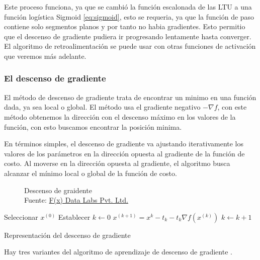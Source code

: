 Este proceso funciona, ya que se cambió la función escalonada de las \gls{LTU} a una función logística Sigmoid \ref{eq:sigmoid}, esto se requeria, ya que la función de paso contiene solo segmentos planos y por tanto no habia gradientes. Esto permitio que el descenso de gradiente pudiera ir progresando lentamente hasta converger. El algoritmo de retroalimentación se puede usar con otras funciones de activación que veremos más adelante.


\subsubsection{El descenso de gradiente\label{sec:gradient-descent}}

El método de descenso de gradiente trata de encontrar un minimo en una función dada, ya sea local o global. El método usa el gradiente negativo ${-\nabla{f}}$, con este método obtenemos la dirección con el descenso máximo en los valores de la función, con esto buscamos encontrar la posición minima.

En términos simples, el descenso de gradiente va ajustando iterativamente los valores de los parámetros en la dirección opuesta al gradiente de la función de costo. Al moverse en la dirección opuesta al gradiente, el algoritmo busca alcanzar el mínimo local o global de la función de costo.

\begin{figure}[H]
    \centering
    \centerline{}
    \caption{Descenso de graidente\\Fuente: \href{https://fxdatalabs.com}{F(x) Data Labs Pvt. Ltd.}}
    \label{fig:gradient-descent}
\end{figure}

\begin{algorithm}[H]
    \SetAlgoLined
    \DontPrintSemicolon
    Seleccionar $x^{(0)}$\;
    Establecer $k \leftarrow 0$\;
     {
        $x^{(k+1)} = x^{k} - t_{k} - t_{k} \nabla f(x^{(k)})$\;
        $k \leftarrow k + 1$\;
    }
    \;
    \label{alg:plot-gradient-descent}
    \caption{Representación del descenso de gradiente}
\end{algorithm}

Hay tres variantes del algoritmo de aprendizaje de descenso de gradiente \cite{ibm-gradient-descent}.

